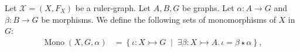 
\begin{notation}
     Let \( \mathcal{X} \mathop{=} (X, F_X) \) be a ruler-graph. Let \( A, B, G \) be graphs. Let \( \alpha \mathop{\colon} A \mathop{\to} G \) and \( \beta \mathop{\colon} B \mathop{\to} G \) be morphisms. 
    We define the following sets of monomorphisms of $X$ in $G$: 
    \begin{align*}
        \operatorname{Mono}(X,G,\alpha) &= \left\{ \iota \mathop{\colon} X \rightarrowtail G \;\middle|\; \exists \beta \mathop{\colon} X \rightarrowtail A.\, \iota \mathop{=} \beta \mathop{\star} \alpha \right\}, 

\end{align*}
\end{notation}
